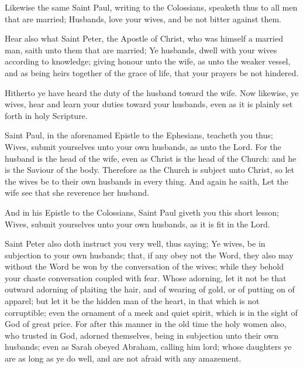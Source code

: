 Likewise the same Saint Paul, writing to the Colossians, speaketh thus to all men that are married; Husbands, love your wives, and be not bitter against them.

Hear also what Saint Peter, the Apostle of Christ, who was himself a married man, saith unto them that are married; Ye husbands, dwell with your wives according to knowledge; giving honour unto the wife, as unto the weaker vessel, and as being heirs together of the grace of life, that your prayers be not hindered.

Hitherto ye have heard the duty of the husband toward the wife. Now likewise, ye wives, hear and learn your duties toward your husbands, even as it is plainly set forth in holy Scripture.

Saint Paul, in the aforenamed Epistle to the Ephesians, teacheth you thus; Wives, submit yourselves unto your own husbands, as unto the Lord. For the husband is the head of the wife, even as Christ is the head of the Church: and he is the Saviour of the body. Therefore as the Church is subject unto Christ, so let the wives be to their own husbands in every thing. And again he saith, Let the wife see that she reverence her husband.

And in his Epistle to the Colossians, Saint Paul giveth you this short lesson; Wives, submit yourselves unto your own husbands, as it is fit in the Lord.

Saint Peter also doth instruct you very well, thus saying; Ye wives, be in subjection to your own husbands; that, if any obey not the Word, they also may without the Word be won by the conversation of the wives; while they behold your chaste conversation coupled with fear. Whose adorning, let it not be that outward adorning of plaiting the hair, and of wearing of gold, or of putting on of apparel; but let it be the hidden man of the heart, in that which is not corruptible; even the ornament of a meek and quiet spirit, which is in the sight of God of great price. For after this manner in the old time the holy women also, who trusted in God, adorned themselves, being in subjection unto their own husbands; even as Sarah obeyed Abraham, calling him lord; whose daughters ye are as long as ye do well, and are not afraid with any amazement.

\fleuron